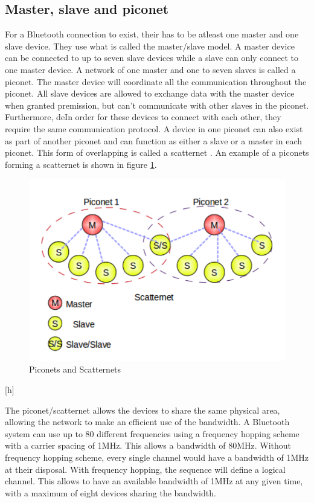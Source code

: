 \documentclass[a4paper, 11pt]{report}
\begin{document}
\subsection{Master, slave and piconet}
For a Bluetooth connection to exist, their has to be atleast one master and one slave device. They use what is called the master/slave model. A master device can be connected to up to seven slave devices while a slave can only connect to one master device. A network of one master and one to seven slaves is called a piconet. The master device will coordinate all the communication throughout the piconet. All slave devices are allowed to exchange data with the master device when granted premission, but can't communicate with other slaves in the piconet. Furthermore, deIn order for these devices to connect with each other, they require the same communication protocol. A device in one piconet can also exist as part of another piconet and can function as either a slave or a master in each piconet. This form of overlapping is called a scatternet \cite{introBluetooth}. An example of a piconets forming a scatternet is shown in figure \ref{fig:scatternet}.

\begin{figure}[h]
	\centering	
	\includegraphics[scale=0.49]{images/scatternet.pdf} 
	\caption{Piconets and Scatternets}\label{fig:scatternet}
\end{figure}[h]

The piconet/scatternet allows the devices to share the same physical area, allowing the network to make an efficient use of the bandwidth. A Bluetooth system can use up to 80 different frequencies using a frequency hopping scheme with a carrier spacing of 1MHz. This allows a bandwidth of 80MHz. Without frequency hopping scheme, every single channel would have a bandwidth of 1MHz at their disposal. With frequency hopping, the sequence will define a logical channel. This allows to have an available bandwidth of 1MHz at any given time, with a maximum of eight devices sharing the bandwidth.
\end{document}
